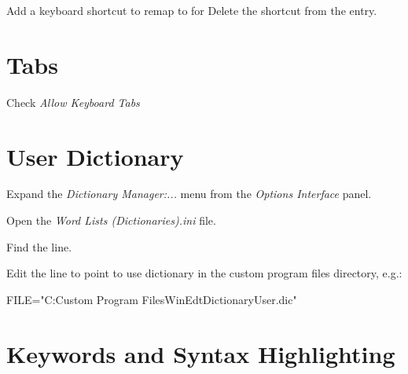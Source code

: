 Add a keyboard shortcut to remap  to  for 
Delete the  shortcut from the  entry.

\section{Tabs}
   \begin{numberedlist}
   	\item {}
   	\item Check \textit{Allow Keyboard Tabs}
   \end{numberedlist}

\section{User Dictionary}
\begin{numberedlist}
	\item Expand the \textit{Dictionary Manager:...} menu from the \textit{Options Interface} panel.
	\item Open the \textit{Word Lists (Dictionaries).ini} file.
	\item Find the  line.
	\item Edit the  line to point to use dictionary in the custom program files directory, e.g.:
	\begin{plainlist}
		\item FILE="C:\tbs{}Custom Program Files\tbs{}WinEdt\tbs{}Dictionary\tbs{}User.dic"
	\end{plainlist}
\end{numberedlist}

\section{Keywords and Syntax Highlighting}
